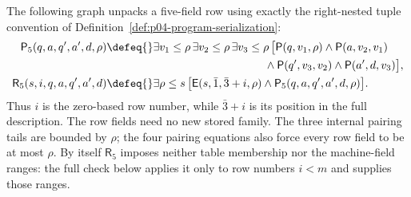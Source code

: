 \begin{definition}
The following graph unpacks a five-field row using exactly the
right-nested tuple convention of
Definition~\ref{def:p04-program-serialization}:
\[
\begin{aligned}
 \mathsf P_5(q,a,q',a',d,\rho)\defeq{}&
  \exists v_1\leq\rho\,\exists v_2\leq\rho\,
  \exists v_3\leq\rho\,\bigl[
       \mathsf P(q,v_1,\rho)\land
       \mathsf P(a,v_2,v_1)\\
 &\hspace{35mm}\land\mathsf P(q',v_3,v_2)
       \land\mathsf P(a',d,v_3)\bigr],\\
 \mathsf R_5(s,i,q,a,q',a',d)\defeq{}&
  \exists\rho\leq s\,
   \bigl[\mathsf E(s,\bar1,\bar3+i,\rho)
           \land\mathsf P_5(q,a,q',a',d,\rho)\bigr].
\end{aligned}
\]
Thus \(i\) is the zero-based row number, while \(\bar3+i\) is
its position in the full description.  The row fields need no new
stored family.  The three internal pairing tails are bounded by
\(\rho\); the four pairing equations also force every row field
to be at most \(\rho\).  By itself \(\mathsf R_5\) imposes
neither table membership nor the machine-field ranges: the full check
below applies it only to row numbers \(i<m\) and supplies those ranges.


\end{definition}
